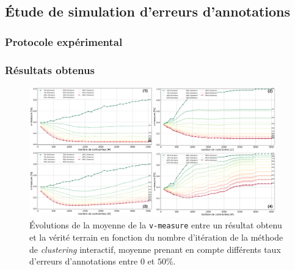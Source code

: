	
	\subsection{Étude de simulation d'erreurs d'annotations}
	\label{section:4.6.1-ETUDE-ROBUSTESSE-SIMULATION-ERREURS-ANNOTATION}
		
	
		\subsubsection{Protocole expérimental}

		\subsubsection{Résultats obtenus}
		
			
			\begin{figure}[!htb]
				\centering
				\includegraphics[width=0.95\textwidth]{figures/etude-erreur-simulation-impact}
				\caption{Évolutions de la moyenne de la \texttt{v-measure} entre un résultat obtenu et la vérité terrain en fonction du nombre d'itération de la méthode de \textit{clustering} interactif, moyenne prenant en compte différents taux d'erreurs d'annotations entre $0$ et $50$\%.}
				\label{figure:4.6.1-ETUDE-ROBUSTESSE-SIMULATION-ERREURS-ANNOTATION}
			\end{figure}

